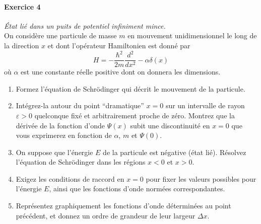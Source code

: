 \newpage
\paragraph{Exercice 4} \textit{État lié dans un puits de potentiel infiniment mince.} \\
On considère une particule de masse $m$ en mouvement unidimensionnel le long de la direction $x$ et dont l'opérateur Hamiltonien est donné par
\begin{equation}
H = -\frac{\hbar^2}{2m} \frac{d^2}{dx^2} - \alpha \delta(x)
\end{equation}
où $\alpha$ est une constante réelle positive dont on donnera les dimensions.
\begin{enumerate}
\item Formez l'équation de Schrödinger qui décrit le mouvement de la particule. 
\item Intégrez-la autour du point ``dramatique'' $x=0$ sur un intervalle de rayon $\varepsilon >0$ quelconque fixé et arbitrairement proche de zéro. Montrez que la dérivée de la fonction d'onde $\Psi(x)$ subit une discontinuité en $x=0$ que vous exprimerez en fonction de $\alpha$, $m$ et $\Psi(0)$.
\item On suppose que l'énergie $E$ de la particule est négative (état lié). Résolvez l'équation de Schrödinger dans les régions $x<0$ et $x>0$.
\item Exigez les conditions de raccord en $x=0$ pour fixer les valeurs possibles pour l'énergie $E$, ainsi que les fonctions d'onde normées correspondantes.
\item Représentez graphiquement les fonctions d'onde déterminées au point précédent, et donnez un ordre de grandeur de leur largeur $\Delta x$. 
\end{enumerate}

\newpage
